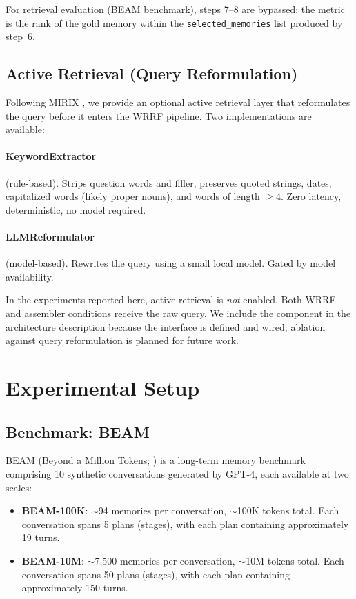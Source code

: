 \documentclass[11pt]{article}
\begin{document}
For retrieval evaluation (BEAM benchmark), steps 7--8 are bypassed:
the metric is the rank of the gold memory within the
\texttt{selected\_memories} list produced by step~6.

\subsection{Active Retrieval (Query Reformulation)}
\label{sec:active-retrieval}

Following MIRIX \citep{Wang2025}, we provide an optional active
retrieval layer that reformulates the query before it enters the WRRF
pipeline.  Two implementations are available:

\paragraph{KeywordExtractor} (rule-based).
Strips question words and filler, preserves quoted strings, dates,
capitalized words (likely proper nouns), and words of length $\geq 4$.
Zero latency, deterministic, no model required.

\paragraph{LLMReformulator} (model-based).
Rewrites the query using a small local model.  Gated by model
availability.

In the experiments reported here, active retrieval is \emph{not}
enabled.  Both WRRF and assembler conditions receive the raw query.
We include the component in the architecture description because the
interface is defined and wired; ablation against query reformulation
is planned for future work.

\section{Experimental Setup}
\label{sec:experiments}

\subsection{Benchmark: BEAM}
\label{sec:beam}

BEAM (Beyond a Million Tokens; \citealt{Tavakoli2026}) is a long-term
memory benchmark comprising 10 synthetic conversations generated by
GPT-4, each available at two scales:

\begin{itemize}
  \item \textbf{BEAM-100K}: $\sim$94 memories per conversation,
    $\sim$100K tokens total.  Each conversation spans 5 plans
    (stages), with each plan containing approximately 19 turns.

  \item \textbf{BEAM-10M}: $\sim$7,500 memories per conversation,
    $\sim$10M tokens total.  Each conversation spans 50 plans
    (stages), with each plan containing approximately 150 turns.
\end{itemize}
\end{document}
